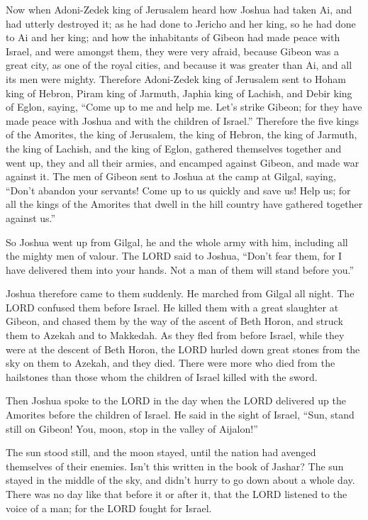  Now when Adoni-Zedek king of Jerusalem heard how Joshua
had taken Ai, and had utterly destroyed it; as he had done to Jericho
and her king, so he had done to Ai and her king; and how the inhabitants
of Gibeon had made peace with Israel, and were amongst them,
 they were very afraid, because Gibeon was a great city,
as one of the royal cities, and because it was greater than Ai, and all
its men were mighty.  Therefore Adoni-Zedek king of
Jerusalem sent to Hoham king of Hebron, Piram king of Jarmuth, Japhia
king of Lachish, and Debir king of Eglon, saying,  ``Come
up to me and help me. Let's strike Gibeon; for they have made peace with
Joshua and with the children of Israel.''  Therefore the
five kings of the Amorites, the king of Jerusalem, the king of Hebron,
the king of Jarmuth, the king of Lachish, and the king of Eglon,
gathered themselves together and went up, they and all their armies, and
encamped against Gibeon, and made war against it.  The men
of Gibeon sent to Joshua at the camp at Gilgal, saying, ``Don't abandon
your servants! Come up to us quickly and save us! Help us; for all the
kings of the Amorites that dwell in the hill country have gathered
together against us.''

 So Joshua went up from Gilgal, he and the whole army with
him, including all the mighty men of valour.  The LORD
said to Joshua, ``Don't fear them, for I have delivered them into your
hands. Not a man of them will stand before you.''

 Joshua therefore came to them suddenly. He marched from
Gilgal all night.  The LORD confused them before Israel.
He killed them with a great slaughter at Gibeon, and chased them by the
way of the ascent of Beth Horon, and struck them to Azekah and to
Makkedah.  As they fled from before Israel, while they
were at the descent of Beth Horon, the LORD hurled down great stones
from the sky on them to Azekah, and they died. There were more who died
from the hailstones than those whom the children of Israel killed with
the sword.

 Then Joshua spoke to the LORD in the day when the LORD
delivered up the Amorites before the children of Israel. He said in the
sight of Israel, ``Sun, stand still on Gibeon! You, moon, stop in the
valley of Aijalon!''

 The sun stood still, and the moon stayed, until the
nation had avenged themselves of their enemies. Isn't this written in
the book of Jashar? The sun stayed in the middle of the sky, and didn't
hurry to go down about a whole day.  There was no day
like that before it or after it, that the LORD listened to the voice of
a man; for the LORD fought for Israel.

